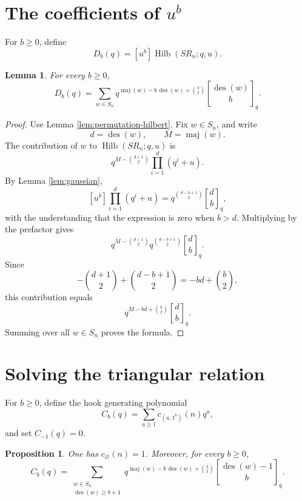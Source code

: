 \documentclass[12pt]{article}
\newtheorem{lemma}[theorem]{Lemma}
\newtheorem{proposition}[theorem]{Proposition}
\DeclareMathOperator{\Hilb}{Hilb}
\DeclareMathOperator{\des}{des}
\DeclareMathOperator{\maj}{maj}
\newcommand{\qbinom}[2]{\genfrac{[}{]}{0pt}{}{#1}{#2}_q}
\begin{document}
\section{The coefficients of \(u^b\)}

For \(b\ge 0\), define
\[
D_b(q)=[u^b]\Hilb(SR_n;q,u).
\]

\begin{lemma}\label{lem:Db}
For every \(b\ge 0\),
\[
D_b(q)
=
\sum_{w\in S_n}
q^{\maj(w)-b\,\des(w)+\binom{b}{2}}
\qbinom{\des(w)}{b}.
\]
\end{lemma}

\begin{proof}
Use Lemma \ref{lem:permutation-hilbert}.  Fix \(w\in S_n\), and write
\[
d=\des(w),\qquad M=\maj(w).
\]
The contribution of \(w\) to \(\Hilb(SR_n;q,u)\) is
\[
q^{M-\binom{d+1}{2}}\prod_{i=1}^{d}(q^i+u).
\]
By Lemma \ref{lem:gaussian},
\[
[u^b]\prod_{i=1}^{d}(q^i+u)
=
q^{\binom{d-b+1}{2}}\qbinom{d}{b},
\]
with the understanding that the expression is zero when \(b>d\).  Multiplying by the prefactor gives
\[
q^{M-\binom{d+1}{2}}
q^{\binom{d-b+1}{2}}
\qbinom{d}{b}.
\]
Since
\[
-\binom{d+1}{2}+\binom{d-b+1}{2}
=
-bd+\binom{b}{2},
\]
this contribution equals
\[
q^{M-bd+\binom{b}{2}}\qbinom{d}{b}.
\]
Summing over all \(w\in S_n\) proves the formula.
\end{proof}

\section{Solving the triangular relation}

For \(b\ge 0\), define the hook generating polynomial
\[
C_b(q)=\sum_{a\ge 1}c_{(a,1^b)}(n)q^a,
\]
and set \(C_{-1}(q)=0\).

\begin{proposition}\label{prop:Cb}
One has \(c_{\varnothing}(n)=1\).  Moreover, for every \(b\ge 0\),
\[
C_b(q)
=
\sum_{\substack{w\in S_n\\ \des(w)\ge b+1}}
q^{\maj(w)-b\,\des(w)+\binom{b}{2}}
\qbinom{\des(w)-1}{b}.
\]
\end{proposition}
\end{document}
